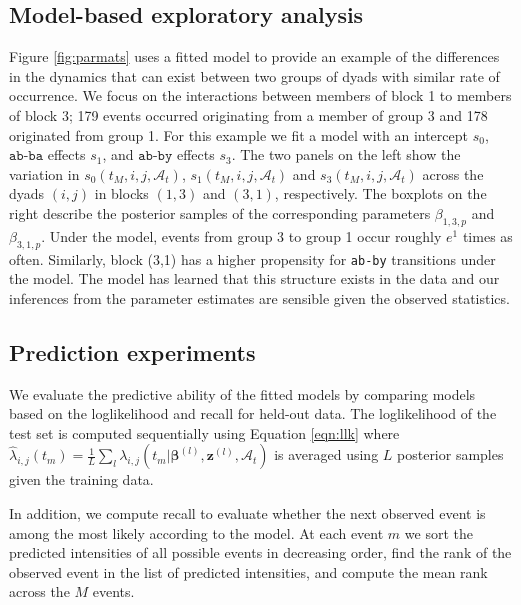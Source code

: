 \subsection{Model-based exploratory analysis}

Figure \ref{fig:parmats} uses a fitted model to provide an example of the differences in the dynamics that can exist between two groups of dyads with similar rate of occurrence.
We focus on the interactions between members of block 1 to members of block 3; 179 events occurred originating from a member of group 3 and 178 originated from group 1.
For this example we fit a model with an intercept $s_0$, $\texttt{ab-ba}$ effects $s_1$, and $\texttt{ab-by}$ effects $s_3$.
The two panels on the left show the variation in $s_0(t_M,i,j,\mathcal{A}_t)$, $s_1(t_M,i,j,\mathcal{A}_t)$ and $s_3(t_M,i,j,\mathcal{A}_t)$ across the dyads $(i,j)$ in blocks $(1,3)$ and $(3,1)$, respectively.
The boxplots on the right describe the posterior samples of the corresponding parameters $\beta_{1,3,p}$ and $\beta_{3,1,p}$.
Under the model, events from group 3 to group 1 occur roughly $e^1$ times as often.
Similarly, block (3,1) has a higher propensity for \texttt{ab-by} transitions under the model.
The model has learned that this structure exists in the data and our inferences from the parameter estimates are sensible given the observed statistics.

\subsection{Prediction experiments}

We evaluate the predictive ability of the fitted models by comparing models based on the loglikelihood and recall for held-out data.
The loglikelihood of the test set is computed sequentially using Equation \ref{eqn:llk} where $\hat{\lambda}_{i,j}(t_m) = \frac{1}{L}\sum_l \lambda_{i,j}(t_m | \boldsymbol{\beta}^{(l)}, \mathbf{z}^{(l)},\mathcal{A}_t)$ is averaged using $L$ posterior samples given the training data.

In addition, we compute recall to evaluate whether the next observed event is among the most likely according to the model.
At each event $m$ we sort the predicted intensities of all possible events in decreasing order, find the rank of the observed event in the list of predicted intensities, and compute the mean rank across the $M$ events.

